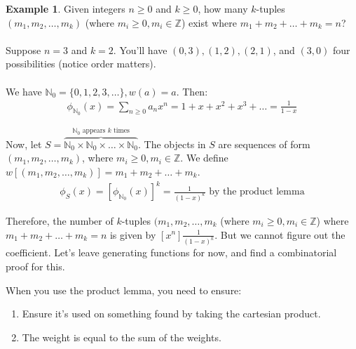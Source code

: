 \documentclass[]{article}
\theoremstyle{definition}
\newtheorem{ex}{Example}[section]
\begin{document}
				\begin{ex}
					Given integers $n \ge 0$ and $k \ge 0$, how many $k$-tuples $(m_1, m_2, \ldots, m_k)$ (where $m_i \ge 0, m_i \in \mathbb{Z}$) exist where $m_1 + m_2 + \ldots + m_k = n$?
					\\ \\
					Suppose $n = 3$ and $k = 2$. You'll have $(0, 3), (1, 2), (2, 1)$, and $(3, 0)$ \textendash{} four possibilities (notice order matters).
					\\ \\
					We have $\mathbb{N}_0 = \{0, 1, 2, 3, \ldots \}, w(a) = a$. Then:
					\begin{align*}
						\phi_{\mathbb{N}_0}(x) = \sum_{n \ge 0} a_n x^n = 1 + x + x^2 + x^3 + \ldots = \frac{1}{1-x}
					\end{align*}

					Now, let $S = \overbrace{\mathbb{N}_0 \times \mathbb{N}_0 \times \ldots \times \mathbb{N}_0}^{\mathbb{N}_0 \text{ appears } k \text{ times}}$. The objects in $S$ are sequences of form $(m_1, m_2, \ldots, m_k)$, where $m_i \ge 0, m_i \in \mathbb{Z}$. We define $w[(m_1, m_2, \ldots, m_k)] = m_1 + m_2 + \ldots + m_k$.
					\begin{align*}
						\phi_S(x) = [\phi_{\mathbb{N}_0}(x)]^k = \frac{1}{(1-x)^k} \text{ by the product lemma}
					\end{align*}

					Therefore, the number of $k$-tuples $(m_1, m_2, \ldots, m_k$ (where $m_i \ge 0, m_i \in \mathbb{Z}$) where $m_1 + m_2 + \ldots + m_k = n$ is given by $[x^n]\frac{1}{(1 - x)^k}$. But we cannot figure out the coefficient. Let's leave generating functions for now, and find a combinatorial proof for this.
				\end{ex}

				When you use the product lemma, you need to ensure:
				\begin{enumerate}
					\item Ensure it's used on something found by taking the cartesian product.
					\item The weight is equal to the sum of the weights.
				\end{enumerate}
				
\end{document}
